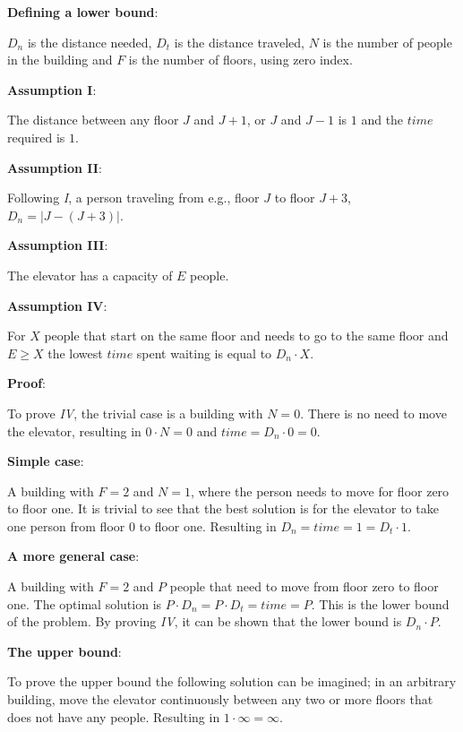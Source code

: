
\textbf{Defining a lower bound}:

$ D_n $ is the distance needed, $ D_t $ is the distance traveled, $ N $ is the number of people in the building and $ F $ is the number of floors, using zero index.

\textbf{Assumption I}:

The distance between any floor $ J $ and $ J + 1 $, or  $ J $ and $ J - 1 $ is $ 1 $ and the $ time $ required is $ 1 $.

\textbf{Assumption II}:

Following \textit{I}, a person traveling from e.g., floor $ J $ to floor $ J + 3 $, $ D_n = |J - ( J + 3)|$.

\textbf{Assumption III}:

The elevator has a capacity of $ E $ people.

\textbf{Assumption IV}:

For $ X $ people that start on the same floor and needs to go to the same floor and $ E \geq X $ the lowest $ time $ spent waiting is equal to $ D_n \cdot X $.

\textbf{Proof}:

To prove \textit{IV}, the trivial case is a building with $ N = 0 $. There is no need to move the elevator, resulting in $ 0 \cdot N = 0 $ and $ time = D_n \cdot 0 = 0 $.

\textbf{Simple case}:

A building with $ F = 2 $ and $ N = 1 $, where the person needs to move for floor zero to floor one. It is trivial to see that the best solution is for the elevator to take one person from floor 0 to floor one. Resulting in $ D_n = time = 1 = D_t \cdot 1 $.

\textbf{A more general case}:

A building with $ F = 2 $ and $ P $ people that need to move from floor zero to floor one. The optimal solution is $ P \cdot D_n = P \cdot D_t = time = P $. This is the lower bound of the problem. By proving \textit{IV}, it can be shown that the lower bound is $ D_n \cdot P $.

\textbf{The upper bound}:

To prove the upper bound the following solution can be imagined; in an arbitrary building, move the elevator continuously between any two or more floors that does not have any people. Resulting in $ 1 \cdot \infty = \infty $.
